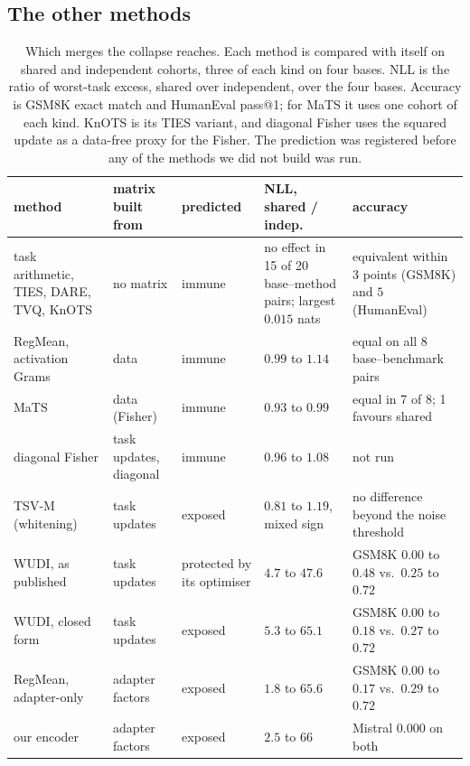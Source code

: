 \subsection{The other methods}\label{subsec:results}

\begin{table}[pos=tbp]
\centering
\small
\caption{Which merges the collapse reaches. Each method is compared with itself
on shared and independent cohorts, three of each kind on four bases. NLL is the
ratio of worst-task excess, shared over independent, over the four bases.
Accuracy is GSM8K exact match and HumanEval pass@1; for MaTS it uses one cohort
of each kind. KnOTS is its TIES variant, and diagonal Fisher uses the squared update
as a data-free proxy for the Fisher. The prediction was registered before any
of the methods we did not build was run.}
\label{tab:exposure}
\setlength{\tabcolsep}{3.5pt}
\begin{tabularx}{\textwidth}{>{\raggedright\arraybackslash}p{2.5cm}
                >{\raggedright\arraybackslash}p{1.7cm}
                >{\raggedright\arraybackslash}p{1.5cm}
                >{\raggedright\arraybackslash}X
                >{\raggedright\arraybackslash}X}
\toprule
method & matrix built from & predicted & NLL, shared / indep. & accuracy \\
\midrule
task arithmetic, TIES, DARE, TVQ, KnOTS & no matrix & immune
  & no effect in 15 of 20 base--method pairs; largest $0.015$ nats
  & equivalent within $3$ points (GSM8K) and $5$ (HumanEval) \\
\addlinespace
RegMean, activation Grams & data & immune & $0.99$ to $1.14$
  & equal on all 8 base--benchmark pairs \\
MaTS & data (Fisher) & immune & $0.93$ to $0.99$
  & equal in 7 of 8; 1 favours shared \\
diagonal Fisher & task updates, diagonal & immune & $0.96$ to $1.08$ & not run \\
\addlinespace
TSV-M (whitening) & task updates & exposed & $0.81$ to $1.19$, mixed sign
  & no difference beyond the noise threshold \\
\addlinespace
WUDI, as published & task updates & protected by its optimiser & $4.7$ to $47.6$
  & GSM8K $0.00$ to $0.48$ vs.\ $0.25$ to $0.72$ \\
WUDI, closed form & task updates & exposed & $5.3$ to $65.1$
  & GSM8K $0.00$ to $0.18$ vs.\ $0.27$ to $0.72$ \\
\addlinespace
RegMean, adapter-only & adapter factors & exposed & $1.8$ to $65.6$
  & GSM8K $0.00$ to $0.17$ vs.\ $0.29$ to $0.72$ \\
our encoder & adapter factors & exposed & $2.5$ to $66$
  & Mistral $0.000$ on both \\
\bottomrule
\end{tabularx}
\end{table}

